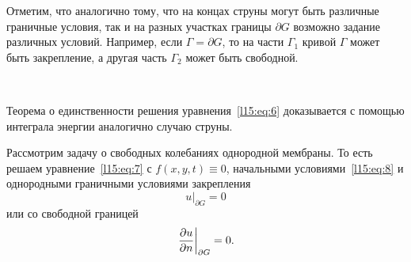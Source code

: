  Отметим, что аналогично тому, что на концах струны могут быть различные граничные условия, так и на разных участках границы $\partial G$ возможно задание различных условий. Например, если $\Gamma=\partial G$, то на части $\Gamma_1$ кривой $\Gamma$ может быть закрепление, а другая часть $\Gamma_2$ может быть свободной.

\begin{figure}[H]\centering
{} %

	\caption{~}
\label{l15:fig:2}
\end{figure}
Теорема о единственности решения уравнения~\eqref{l15:eq:6} доказывается с помощью интеграла энергии аналогично случаю струны.

Рассмотрим задачу о свободных колебаниях однородной мембраны. То есть решаем уравнение~\eqref{l15:eq:7} с $f(x,y,t)\equiv0$, начальными условиями~\eqref{l15:eq:8} и однородными граничными условиями закрепления
\begin{equation}\label{l15:eq:9}
	 u\Big|_{\partial G}=0
\end{equation}
или со свободной границей
\begin{equation}\label{l15:eq:10}
	 \left.\frac{\partial u}{\partial n}\right|_{\partial G}=0.
\end{equation}

